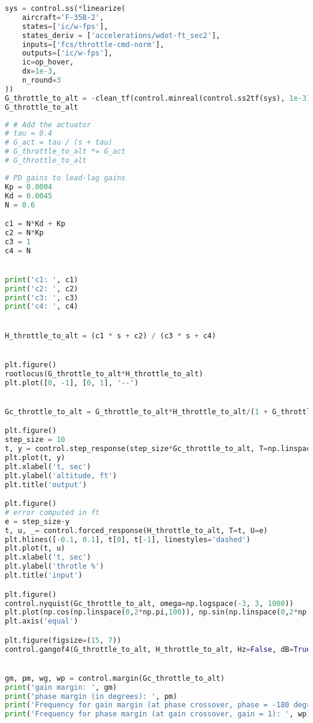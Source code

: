 \begin{lstlisting}[language=Python]
sys = control.ss(*linearize(
    aircraft='F-35B-2',
    states=['ic/w-fps'],
    states_deriv = ['accelerations/wdot-ft_sec2'],
    inputs=['fcs/throttle-cmd-norm'],
    outputs=['ic/w-fps'],
    ic=op_hover,
    dx=1e-3,
    n_round=3
))
G_throttle_to_alt = -clean_tf(control.minreal(control.ss2tf(sys), 1e-3))/s
G_throttle_to_alt
\end{lstlisting}

\begin{lstlisting}[language=Python]
# # Add the actuator 
# tau = 0.4
# G_act = tau / (s + tau)
# G_throttle_to_alt *= G_act
# G_throttle_to_alt
\end{lstlisting}

\begin{lstlisting}[language=Python]
# PD gains to lead-lag gains 
Kp = 0.0004
Kd = 0.0045
N = 0.6

c1 = N*Kd + Kp
c2 = N*Kp
c3 = 1
c4 = N


print('c1: ', c1)
print('c2: ', c2)
print('c3: ', c3)
print('c4: ', c4)


H_throttle_to_alt = (c1 * s + c2) / (c3 * s + c4)


plt.figure()
rootlocus(G_throttle_to_alt*H_throttle_to_alt)
plt.plot([0, -1], [0, 1], '--')


Gc_throttle_to_alt = G_throttle_to_alt*H_throttle_to_alt/(1 + G_throttle_to_alt*H_throttle_to_alt)

plt.figure()
step_size = 10
t, y = control.step_response(step_size*Gc_throttle_to_alt, T=np.linspace(0, 40, 1000))
plt.plot(t, y)
plt.xlabel('t, sec')
plt.ylabel('altitude, ft')
plt.title('output')

plt.figure()
# error computed in ft
e = step_size-y
t, u, _= control.forced_response(H_throttle_to_alt, T=t, U=e)
plt.hlines([-0.1, 0.1], t[0], t[-1], linestyles='dashed')
plt.plot(t, u)
plt.xlabel('t, sec')
plt.ylabel('throtle %')
plt.title('input')

plt.figure()
control.nyquist(Gc_throttle_to_alt, omega=np.logspace(-3, 3, 1000))
plt.plot(np.cos(np.linspace(0,2*np.pi,100)), np.sin(np.linspace(0,2*np.pi,100)), '--')
plt.axis('equal')

plt.figure(figsize=(15, 7))
control.gangof4(G_throttle_to_alt, H_throttle_to_alt, Hz=False, dB=True)


gm, pm, wg, wp = control.margin(Gc_throttle_to_alt)
print('gain margin: ', gm)
print('phase margin (in degrees): ', pm)
print('Frequency for gain margin (at phase crossover, phase = -180 degrees): ', wg)
print('Frequency for phase margin (at gain crossover, gain = 1): ', wp)
\end{lstlisting}

